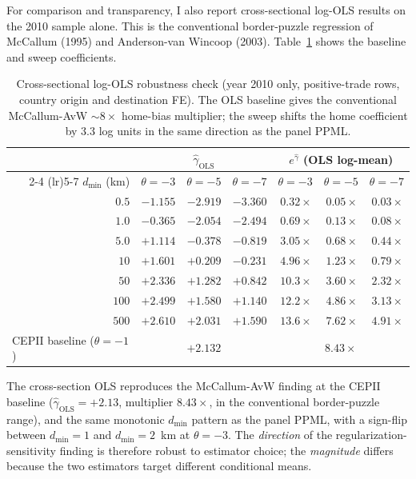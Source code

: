 \documentclass[11pt, letterpaper]{article}
\theoremstyle{definition}
\begin{document}
For comparison and transparency, I also report cross-sectional log-OLS
results on the 2010 sample alone. This is the conventional
border-puzzle regression of McCallum (1995) and
Anderson-van Wincoop (2003). Table~\ref{tab:ols-cross-section} shows
the baseline and sweep coefficients.

\begin{table}[h]
\centering
\small
\caption{Cross-sectional log-OLS robustness check (year 2010 only,
positive-trade rows, country origin and destination FE). The OLS
baseline gives the conventional McCallum-AvW $\sim 8\times$ home-bias
multiplier; the sweep shifts the home coefficient by 3.3 log units in
the same direction as the panel PPML.\label{tab:ols-cross-section}}
\begin{tabular}{r r r r r r r}
\toprule
& \multicolumn{3}{c}{$\hat{\gamma}_{\text{OLS}}$} & \multicolumn{3}{c}{$e^{\hat{\gamma}}$ (OLS log-mean)} \\
\cmidrule(lr){2-4} \cmidrule(lr){5-7}
$d_{\min}$ (km) & $\theta = -3$ & $\theta = -5$ & $\theta = -7$ & $\theta = -3$ & $\theta = -5$ & $\theta = -7$ \\
\midrule
$0.5$ & $-1.155$ & $-2.919$ & $-3.360$ & $0.32\times$ & $0.05\times$ & $0.03\times$ \\
$1.0$ & $-0.365$ & $-2.054$ & $-2.494$ & $0.69\times$ & $0.13\times$ & $0.08\times$ \\
$5.0$ & $+1.114$ & $-0.378$ & $-0.819$ & $3.05\times$ & $0.68\times$ & $0.44\times$ \\
$10$  & $+1.601$ & $+0.209$ & $-0.231$ & $4.96\times$ & $1.23\times$ & $0.79\times$ \\
$50$  & $+2.336$ & $+1.282$ & $+0.842$ & $10.3\times$ & $3.60\times$ & $2.32\times$ \\
$100$ & $+2.499$ & $+1.580$ & $+1.140$ & $12.2\times$ & $4.86\times$ & $3.13\times$ \\
$500$ & $+2.610$ & $+2.031$ & $+1.590$ & $13.6\times$ & $7.62\times$ & $4.91\times$ \\
\midrule
\multicolumn{1}{l}{CEPII baseline ($\theta = -1$)}
& \multicolumn{3}{c}{$+2.132$}
& \multicolumn{3}{c}{$8.43\times$} \\
\bottomrule
\end{tabular}
\end{table}

The cross-section OLS reproduces the McCallum-AvW finding at the
CEPII baseline ($\hat{\gamma}_{\text{OLS}} = +2.13$, multiplier
$8.43\times$, in the conventional border-puzzle range), and the same
monotonic $d_{\min}$ pattern as the panel PPML, with a sign-flip between
$d_{\min} = 1$ and $d_{\min} = 2$~km at $\theta = -3$. The
\emph{direction} of the regularization-sensitivity finding is therefore
robust to estimator choice; the \emph{magnitude} differs because the
two estimators target different conditional means.
\end{document}
